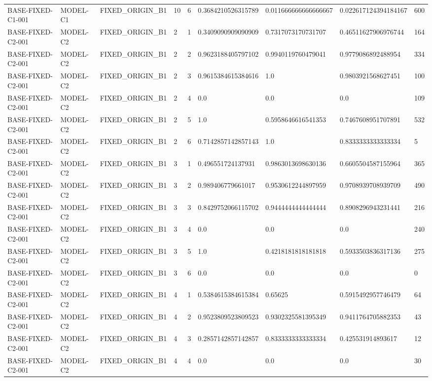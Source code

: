 \begin{tabular}{lllllllll}
BASE-FIXED-C1-001 & MODEL-C1 & FIXED\_ORIGIN\_B1 & 10 & 6 & 0.3684210526315789 & 0.011666666666666667 & 0.022617124394184167 & 600 \\
BASE-FIXED-C2-001 & MODEL-C2 & FIXED\_ORIGIN\_B1 & 2 & 1 & 0.3409090909090909 & 0.7317073170731707 & 0.46511627906976744 & 164 \\
BASE-FIXED-C2-001 & MODEL-C2 & FIXED\_ORIGIN\_B1 & 2 & 2 & 0.9623188405797102 & 0.9940119760479041 & 0.9779086892488954 & 334 \\
BASE-FIXED-C2-001 & MODEL-C2 & FIXED\_ORIGIN\_B1 & 2 & 3 & 0.9615384615384616 & 1.0 & 0.9803921568627451 & 100 \\
BASE-FIXED-C2-001 & MODEL-C2 & FIXED\_ORIGIN\_B1 & 2 & 4 & 0.0 & 0.0 & 0.0 & 109 \\
BASE-FIXED-C2-001 & MODEL-C2 & FIXED\_ORIGIN\_B1 & 2 & 5 & 1.0 & 0.5958646616541353 & 0.7467608951707891 & 532 \\
BASE-FIXED-C2-001 & MODEL-C2 & FIXED\_ORIGIN\_B1 & 2 & 6 & 0.7142857142857143 & 1.0 & 0.8333333333333334 & 5 \\
BASE-FIXED-C2-001 & MODEL-C2 & FIXED\_ORIGIN\_B1 & 3 & 1 & 0.496551724137931 & 0.9863013698630136 & 0.6605504587155964 & 365 \\
BASE-FIXED-C2-001 & MODEL-C2 & FIXED\_ORIGIN\_B1 & 3 & 2 & 0.989406779661017 & 0.9530612244897959 & 0.9708939708939709 & 490 \\
BASE-FIXED-C2-001 & MODEL-C2 & FIXED\_ORIGIN\_B1 & 3 & 3 & 0.8429752066115702 & 0.9444444444444444 & 0.8908296943231441 & 216 \\
BASE-FIXED-C2-001 & MODEL-C2 & FIXED\_ORIGIN\_B1 & 3 & 4 & 0.0 & 0.0 & 0.0 & 240 \\
BASE-FIXED-C2-001 & MODEL-C2 & FIXED\_ORIGIN\_B1 & 3 & 5 & 1.0 & 0.4218181818181818 & 0.5933503836317136 & 275 \\
BASE-FIXED-C2-001 & MODEL-C2 & FIXED\_ORIGIN\_B1 & 3 & 6 & 0.0 & 0.0 & 0.0 & 0 \\
BASE-FIXED-C2-001 & MODEL-C2 & FIXED\_ORIGIN\_B1 & 4 & 1 & 0.5384615384615384 & 0.65625 & 0.5915492957746479 & 64 \\
BASE-FIXED-C2-001 & MODEL-C2 & FIXED\_ORIGIN\_B1 & 4 & 2 & 0.9523809523809523 & 0.9302325581395349 & 0.9411764705882353 & 43 \\
BASE-FIXED-C2-001 & MODEL-C2 & FIXED\_ORIGIN\_B1 & 4 & 3 & 0.2857142857142857 & 0.8333333333333334 & 0.425531914893617 & 12 \\
BASE-FIXED-C2-001 & MODEL-C2 & FIXED\_ORIGIN\_B1 & 4 & 4 & 0.0 & 0.0 & 0.0 & 30 \\

\end{tabular}
